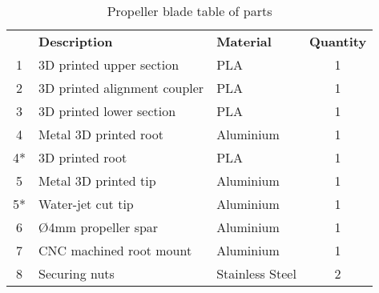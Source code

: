 \begin{table}[h]
\centering
\begin{tabular}{cllc}
\rowcolor[HTML]{C0C0C0} 
\multicolumn{1}{l}{\cellcolor[HTML]{C0C0C0}\textbf{Part No.}} & \textbf{Description}         & \textbf{Material} & \multicolumn{1}{l}{\cellcolor[HTML]{C0C0C0}\textbf{Quantity}} \\
1                                                             & 3D printed upper section     & PLA               & 1                                                             \\
2                                                             & 3D printed alignment coupler & PLA               & 1                                                             \\
3                                                             & 3D printed lower section     & PLA               & 1                                                             \\
4                                                             & Metal 3D printed root        & Aluminium         & 1                                                             \\
4*                                                            & 3D printed root              & PLA               & 1                                                             \\
5                                                             & Metal 3D printed tip         & Aluminium         & 1                                                             \\
5*                                                            & Water-jet cut tip            & Aluminium         & 1                                                             \\
6                                                             & Ø4mm propeller spar          & Aluminium         & 1                                                             \\
7                                                             & CNC machined root mount      & Aluminium         & 1                                                             \\
8                                                             & Securing nuts                & Stainless Steel   & 2                                                            
\end{tabular}
\caption{Propeller blade table of parts}
\label{tab:propParts}
\end{table}